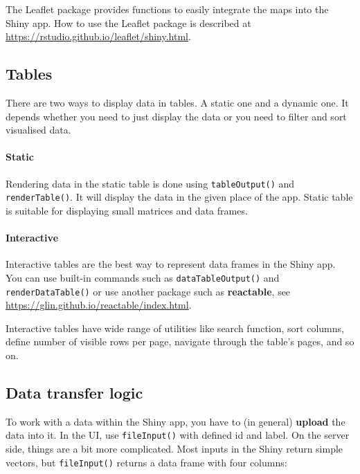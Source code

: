 \documentclass[
]{article}
\begin{document}
The Leaflet package provides functions to easily integrate the maps into
the Shiny app. How to use the Leaflet package is described at
\url{https://rstudio.github.io/leaflet/shiny.html}.

\hypertarget{tables}{%
\subsection{Tables}\label{tables}}

There are two ways to display data in tables. A static one and a dynamic
one. It depends whether you need to just display the data or you need to
filter and sort visualised data.

\hypertarget{static-1}{%
\paragraph{Static}\label{static-1}}

Rendering data in the static table is done using \texttt{tableOutput()}
and \texttt{renderTable()}. It will display the data in the given place
of the app. Static table is suitable for displaying small matrices and
data frames.

\hypertarget{interactive-1}{%
\paragraph{Interactive}\label{interactive-1}}

Interactive tables are the best way to represent data frames in the
Shiny app. You can use built-in commands such as
\texttt{dataTableOutput()} and \texttt{renderDataTable()} or use another
package such as \textbf{reactable}, see
\url{https://glin.github.io/reactable/index.html}.

Interactive tables have wide range of utilities like search function,
sort columns, define number of visible rows per page, navigate through
the table's pages, and so on.

\hypertarget{data-transfer-logic}{%
\subsection{Data transfer logic}\label{data-transfer-logic}}

To work with a data within the Shiny app, you have to (in general)
\textbf{upload} the data into it. In the UI, use \texttt{fileInput()}
with defined id and label. On the server side, things are a bit more
complicated. Most inputs in the Shiny return simple vectors, but
\texttt{fileInput()} returns a data frame with four columns:
\end{document}
